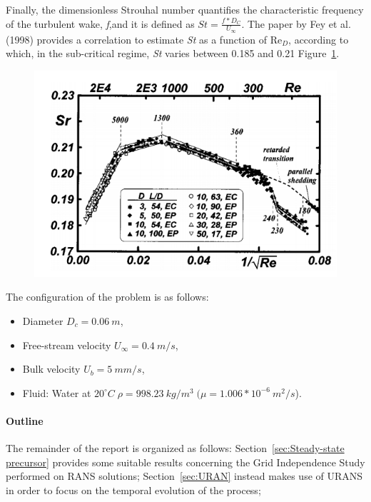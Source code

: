 \documentclass[12pt]{article}
\begin{document}
        Finally, the dimensionless Strouhal number quantifies the characteristic frequency of the turbulent wake, \textit{f},and it is defined as $St = \frac{f*D_C}{U_\infty}$. The paper by Fey et al. (1998) provides a correlation to estimate \textit{St} as a function of $\text{Re}_D$, according to which, in the sub-critical regime, \textit{St} varies between 0.185 and 0.21 Figure~\ref{fig:strouhal}.


 \begin{figure}[!ht]
                \includegraphics[width=\textwidth]{Strouhal.png}
                \centering
                \caption{}
                \label{fig:strouhal}
        \end{figure}


        The configuration of the problem is as follows:
        \begin{itemize}
                \item Diameter \( D_c = 0.06 \: m \),
                \item Free-stream velocity \( U_\infty = 0.4 \: m/s \),
                \item Bulk velocity \( U_b = 5 \: mm/s \),
                \item Fluid: Water at \( 20^{\circ}C \; \rho = 998.23 \: kg/m^3\;( \mu=1.006*10^{-6} \:m^2/s\)).
        \end{itemize}


        \paragraph{Outline}
        The remainder of the report is organized as follows: Section~\ref{sec:Steady-state precursor} provides some suitable results concerning the Grid Independence Study performed on RANS solutions; Section~\ref{sec:URAN} instead makes use of URANS in order to focus on the temporal evolution  of the process;
      
\end{document}
